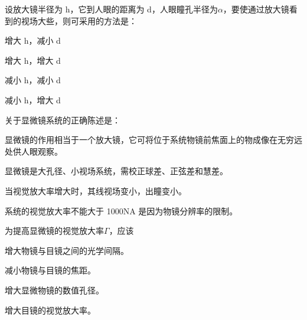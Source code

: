 \documentclass[padl, analysis, notocnum]{ExBook}
\newcommand{\answerarea}[1][3.5cm]{%
  \par\vspace{1mm}%
  \noindent{\color{themeColor!35}\rule{\linewidth}{0.4pt}}\par
  \noindent\begin{minipage}[t][#1][t]{\linewidth}\vspace{0pt}\end{minipage}\par
  \noindent{\color{themeColor!35}\rule{\linewidth}{0.4pt}}\par
}
\begin{document}
\begin{qitems}[startnum=4]
\qitem 设放大镜半径为 h，它到人眼的距离为 d，人眼瞳孔半径为$\alpha$，要使通过放大镜看到的视场大些，则可采用的方法是：
\par\noindent\hspace{2em}增大 h，减小 d
\par\noindent\hspace{2em}增大 h，增大 d
\par\noindent\hspace{2em}减小 h，减小 d
\par\noindent\hspace{2em}减小 h，增大 d
\label{q:134:start}
\answerarea[4.0cm]
\label{q:134:end}
\end{qitems}

\begin{qitems}[startnum=5]
\qitem 关于显微镜系统的正确陈述是：
\par\noindent\hspace{2em}显微镜的作用相当于一个放大镜，它可将位于系统物镜前焦面上的物成像在无穷远处供人眼观察。
\par\noindent\hspace{2em}显微镜是大孔径、小视场系统，需校正球差、正弦差和慧差。
\par\noindent\hspace{2em}当视觉放大率增大时，其线视场变小，出瞳变小。
\par\noindent\hspace{2em}系统的视觉放大率不能大于 1000NA 是因为物镜分辨率的限制。
\label{q:135:start}
\answerarea[4.0cm]
\label{q:135:end}
\end{qitems}

\begin{qitems}[startnum=6]
\qitem 为提高显微镜的视觉放大率$\Gamma$，应该
\par\noindent\hspace{2em}增大物镜与目镜之间的光学间隔。
\par\noindent\hspace{2em}减小物镜与目镜的焦距。
\par\noindent\hspace{2em}增大显微物镜的数值孔径。
\par\noindent\hspace{2em}增大目镜的视觉放大率。
\label{q:136:start}
\answerarea[4.0cm]
\label{q:136:end}
\end{qitems}
\end{document}
